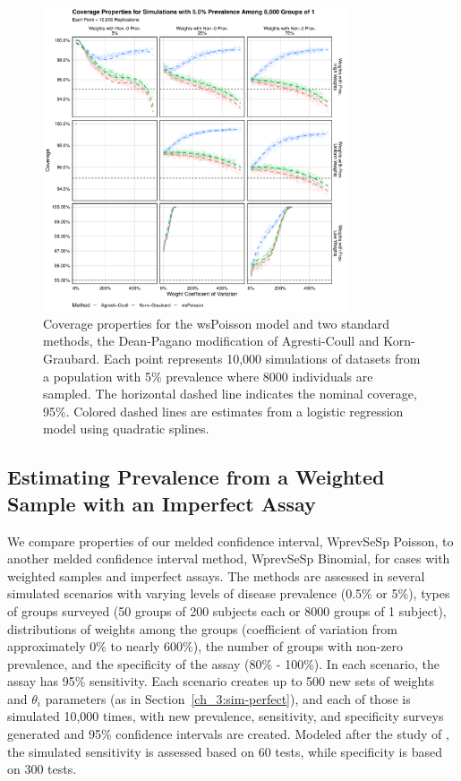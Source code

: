 \begin{figure}
\centering
\includegraphics[width=0.8\textwidth]{perfect_coverage_8000_groups_0_05_prev}
\caption{Coverage properties for the wsPoisson model and two standard methods, the Dean-Pagano modification of Agresti-Coull and Korn-Graubard.
Each point represents 10,000 simulations of datasets from a population with 5\% prevalence where 8000 individuals are sampled.
The horizontal dashed line indicates the nominal coverage, 95\%.
Colored dashed lines are estimates from a logistic regression model using quadratic splines.}
\label{ch_3:fig:perfect_coverage_8000_groups_0_05_prev}
\end{figure}


\subsection{Estimating Prevalence from a Weighted Sample with an Imperfect Assay}

We compare properties of our melded confidence interval, WprevSeSp Poisson, to another melded confidence interval method, WprevSeSp Binomial, for cases with weighted samples and imperfect assays.
The methods are assessed in several simulated scenarios with varying levels of disease prevalence (0.5\% or 5\%), types of groups surveyed (50 groups of 200 subjects each or 8000 groups of 1 subject), distributions of weights among the groups (coefficient of variation from approximately 0\% to nearly 600\%), the number of groups with non-zero prevalence, and the specificity of the assay (80\% - 100\%).
In each scenario, the assay has 95\% sensitivity.
Each scenario creates up to 500 new sets of weights and $\theta_i$ parameters (as in Section~\ref{ch_3:sim-perfect}), and each of those is simulated 10,000 times, with new prevalence, sensitivity, and specificity surveys generated and 95\% confidence intervals are created.
Modeled after the study of \citet{Kali:2021}, the simulated sensitivity is assessed based on 60 tests, while specificity is based on 300 tests.

